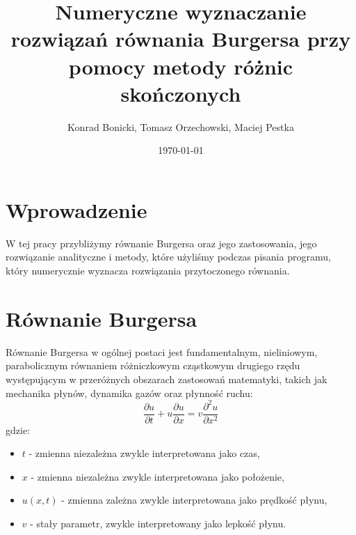 \documentclass[a4paper,12pt]{article}
\title{Numeryczne wyznaczanie rozwiązań równania Burgersa przy pomocy metody różnic skończonych}
\author{Konrad Bonicki, Tomasz Orzechowski, Maciej Pestka}
\date{\today}
\begin{document}
\maketitle

\tableofcontents
\newpage

\section{Wprowadzenie}
W tej pracy przybliżymy równanie Burgersa oraz jego zastosowania, jego rozwiązanie analityczne i metody, które użyliśmy podczas pisania programu, który numerycznie wyznacza rozwiązania przytoczonego równania.

\section{Równanie Burgersa}
Równanie Burgersa w ogólnej postaci jest fundamentalnym, nieliniowym, parabolicznym równaniem różniczkowym cząstkowym drugiego rzędu występującym w przeróżnych obszarach zastosowań matematyki, takich jak mechanika płynów, dynamika gazów oraz płynność ruchu:
\begin{equation}
\frac{\partial u}{\partial t} + u \frac{\partial u}{\partial x} = v \frac{\partial ^2 u}{\partial x^2}
\end{equation}
gdzie: 
\begin{itemize}
\item $t$ - zmienna niezależna zwykle interpretowana jako czas,
\item $x$ - zmienna niezależna zwykle interpretowana jako położenie,
\item $u(x,t)$ - zmienna zależna zwykle interpretowana jako prędkość płynu,
\item $v$ - stały parametr, zwykle interpretowany jako lepkość płynu.
\end{itemize}
\end{document}
